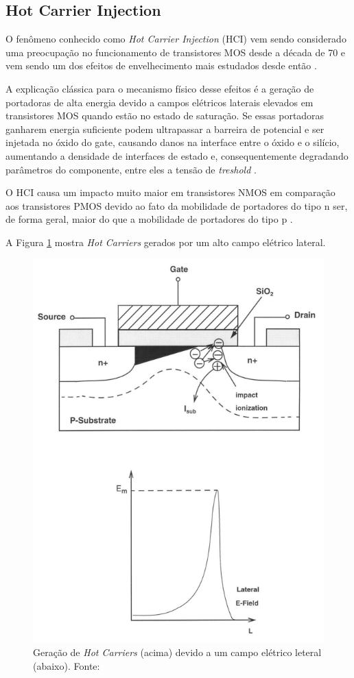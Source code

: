 \subsection{Hot Carrier Injection}

O fenômeno conhecido como \textit{Hot Carrier Injection} (HCI) vem sendo considerado uma preocupação no funcionamento de transistores MOS desde a década de 70 e vem sendo um dos efeitos de envelhecimento mais estudados desde então \cite{Butzen}.

A explicação clássica para o mecanismo físico desse efeitos é a geração de portadoras de alta energia devido a campos elétricos laterais elevados em transistores MOS quando estão no estado de saturação. Se essas portadoras ganharem energia suficiente podem ultrapassar a barreira de potencial e ser injetada no óxido do gate, causando danos na interface entre o óxido e o silício, aumentando a densidade de interfaces de estado e, consequentemente degradando parâmetros do componente, entre eles a tensão de \textit{treshold} \cite{Cacho}.

O HCI causa um impacto muito maior em transistores NMOS em comparação aos transistores PMOS devido ao fato da mobilidade de portadores do tipo n ser, de forma geral, maior do que a mobilidade de portadores do tipo p \cite{Jiang}.

A Figura \ref{fig:hci} mostra \textit{Hot Carriers} gerados por um alto campo elétrico lateral.

\begin{figure}[H]
    \centering
    \includegraphics[scale=0.5]{figures/ReferencialTeorico/HCI.png}
    \caption{Geração de \textit{Hot Carriers} (acima) devido a um campo elétrico leteral (abaixo). Fonte: \cite{Jiang}}
    \label{fig:hci}
\end{figure}

